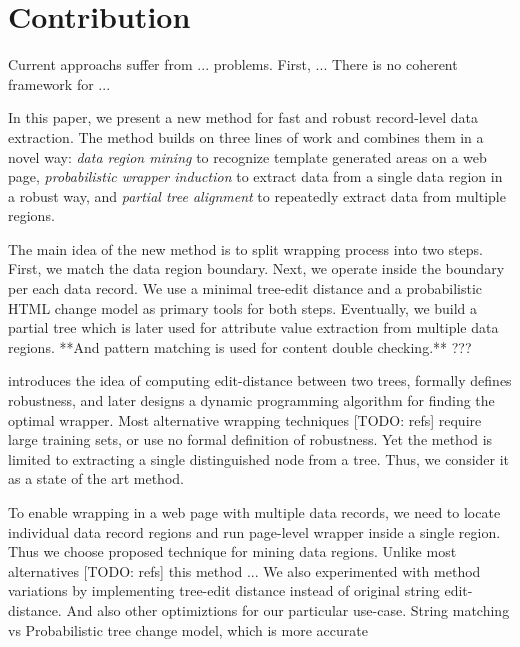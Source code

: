 \section{Contribution}



Current approachs suffer from ... problems. First, ... There is no coherent framework for ...

In this paper, we present a new method for fast and robust record-level data extraction. The method builds on three lines of work and combines them in a novel way: \emph{data region mining} \cite{liu2009a} to recognize template generated areas on a web page, \emph{probabilistic wrapper induction} \cite{DBLP:journals/pvldb/ParameswaranDGR11} to extract data from a single data region in a robust way, and \emph{partial tree alignment} \cite{zhai2005a} to repeatedly extract data from multiple regions. 


The main idea of the new method is to split wrapping process into two steps. First, we match the data region boundary. Next, we operate inside the boundary per each data record. We use a minimal tree-edit distance and a probabilistic HTML change model as primary tools for both steps. Eventually, we build a partial tree which is later used for attribute value extraction from multiple data regions. **And pattern matching is used for content double checking.** ???

\cite{DBLP:journals/pvldb/ParameswaranDGR11} introduces the idea of computing edit-distance between two trees, formally defines robustness, and later designs a dynamic programming algorithm for finding the optimal wrapper. Most alternative wrapping techniques [TODO: refs] require large training sets, or use no formal definition of robustness. Yet the method is limited to extracting a single distinguished node from a tree. Thus, we consider it as a state of the art method.

To enable wrapping in a web page with multiple data records, we need to locate individual data record regions and run page-level wrapper inside a single region. Thus we choose \cite{liu2009a} proposed technique for mining data regions. Unlike most alternatives [TODO: refs] this method ... We also experimented with method variations by implementing tree-edit distance instead of original string edit-distance. And also other optimiztions for our particular use-case.
String matching vs Probabilistic tree change model, which is more accurate

